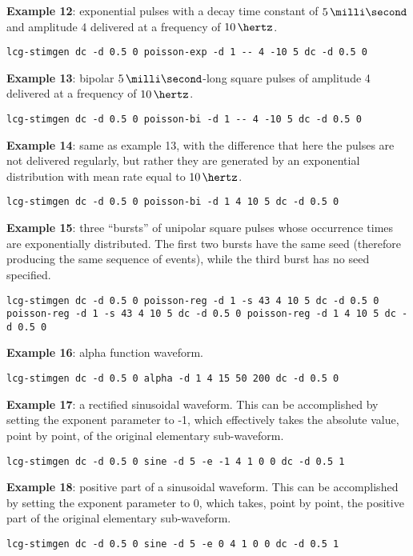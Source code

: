 \textbf{Example 12}: exponential pulses with a decay time constant of
$5\,\milli\second$ and amplitude 4 delivered at a frequency of
$10\,\hertz$.
\begin{lstlisting}
lcg-stimgen dc -d 0.5 0 poisson-exp -d 1 -- 4 -10 5 dc -d 0.5 0
\end{lstlisting}

\textbf{Example 13}: bipolar $5\,\milli\second$-long square pulses
of amplitude 4 delivered at a frequency of $10\,\hertz$.
\begin{lstlisting}
lcg-stimgen dc -d 0.5 0 poisson-bi -d 1 -- 4 -10 5 dc -d 0.5 0
\end{lstlisting}

\textbf{Example 14}: same as example 13, with the difference that here
the pulses are not delivered regularly, but rather they are generated
by an exponential distribution with mean rate equal to $10\,\hertz$.
\begin{lstlisting}
lcg-stimgen dc -d 0.5 0 poisson-bi -d 1 4 10 5 dc -d 0.5 0
\end{lstlisting}

\textbf{Example 15}: three ``bursts'' of unipolar square pulses whose
occurrence times are exponentially distributed. The first two bursts
have the same seed (therefore producing the same sequence of events),
while the third burst has no seed specified.
\begin{lstlisting}
lcg-stimgen dc -d 0.5 0 poisson-reg -d 1 -s 43 4 10 5 dc -d 0.5 0 poisson-reg -d 1 -s 43 4 10 5 dc -d 0.5 0 poisson-reg -d 1 4 10 5 dc -d 0.5 0
\end{lstlisting}

\textbf{Example 16}: alpha function waveform.
\begin{lstlisting}
lcg-stimgen dc -d 0.5 0 alpha -d 1 4 15 50 200 dc -d 0.5 0
\end{lstlisting}

\textbf{Example 17}: a rectified sinusoidal waveform. This can be
accomplished by setting the exponent parameter to -1, which
effectively takes the absolute value, point by point, of the original
elementary sub-waveform.
\begin{lstlisting}
lcg-stimgen dc -d 0.5 0 sine -d 5 -e -1 4 1 0 0 dc -d 0.5 1
\end{lstlisting}

\textbf{Example 18}: positive part of a sinusoidal waveform. This can
be accomplished by setting the exponent parameter to 0, which takes,
point by point, the positive part of the original elementary sub-waveform.
\begin{lstlisting}
lcg-stimgen dc -d 0.5 0 sine -d 5 -e 0 4 1 0 0 dc -d 0.5 1
\end{lstlisting}

